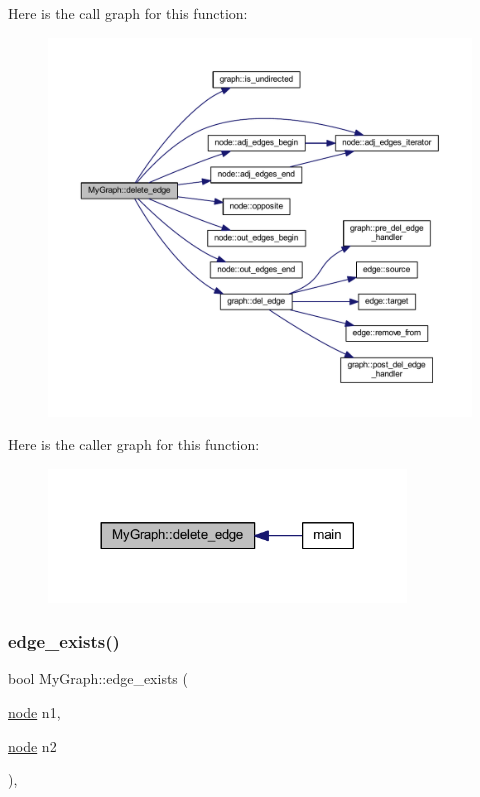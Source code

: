 Here is the call graph for this function\+:\nopagebreak
\begin{figure}[H]
\begin{center}
\leavevmode
\includegraphics[width=350pt]{class_my_graph_a4070383c56ef8f54e9fdc595d65b89de_cgraph}
\end{center}
\end{figure}
Here is the caller graph for this function\+:\nopagebreak
\begin{figure}[H]
\begin{center}
\leavevmode
\includegraphics[width=269pt]{class_my_graph_a4070383c56ef8f54e9fdc595d65b89de_icgraph}
\end{center}
\end{figure}
\mbox{\label{class_my_graph_a67910a9535e93bc6dcf53e961760b6da}} 
\subsubsection{\texorpdfstring{edge\+\_\+exists()}{edge\_exists()}}
{\footnotesize\ttfamily bool My\+Graph\+::edge\+\_\+exists (\begin{DoxyParamCaption}\item[{\mbox{\hyperlink{classnode}{node}}}]{n1,  }\item[{\mbox{\hyperlink{classnode}{node}}}]{n2 }\end{DoxyParamCaption})\hspace{0.3cm}{\ttfamily [virtual]}, {\ttfamily [inherited]}}

